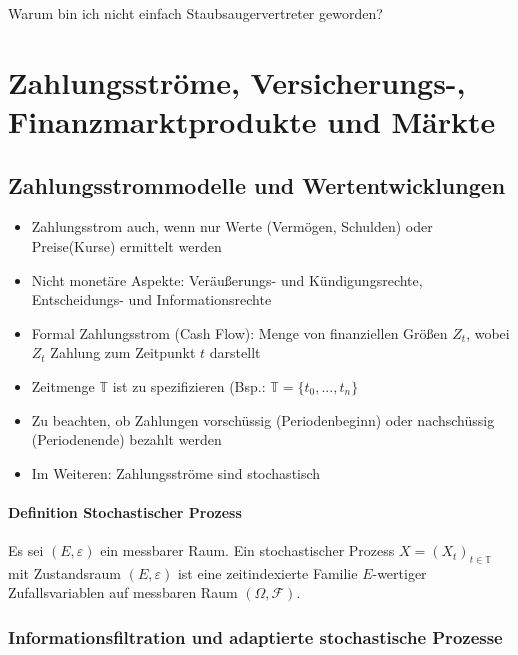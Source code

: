 \documentclass[12pt]{report}
\theoremstyle{dotless}
\theoremstyle{definition}
\begin{document}
\begin{titlepage}
	Warum bin ich nicht einfach Staubsaugervertreter geworden?
\end{titlepage}

\tableofcontents

\chapter{Zahlungsströme, Versicherungs-, Finanzmarktprodukte und Märkte}

\section{Zahlungsstrommodelle und Wertentwicklungen}

\begin{itemize}
\item Zahlungsstrom auch, wenn nur Werte (Vermögen, Schulden) oder Preise(Kurse) ermittelt werden
\item Nicht monetäre Aspekte: Veräußerungs- und Kündigungsrechte, Entscheidungs- und Informationsrechte
\item Formal Zahlungsstrom (Cash Flow): Menge von finanziellen Größen $Z_t$, wobei $Z_t$ Zahlung zum Zeitpunkt $t$ darstellt
\item Zeitmenge $\mathbb{T}$ ist zu spezifizieren (Bsp.: $\mathbb{T}=\{t_0, ..., t_n\}$
\item Zu beachten, ob Zahlungen vorschüssig (Periodenbeginn) oder nachschüssig (Periodenende) bezahlt werden
\item Im Weiteren: Zahlungsströme sind stochastisch
\end{itemize}

\subsubsection{Definition Stochastischer Prozess}
Es sei $(E, \varepsilon)$ ein messbarer Raum. Ein stochastischer Prozess $X=(X_t)_{t \in \mathbb{T}}$ mit Zustandsraum $(E, \varepsilon)$ ist eine zeitindexierte Familie $E$-wertiger Zufallsvariablen auf messbaren Raum $(\Omega, \mathcal{F})$.


\subsection{Informationsfiltration und adaptierte stochastische Prozesse}
\end{document}
